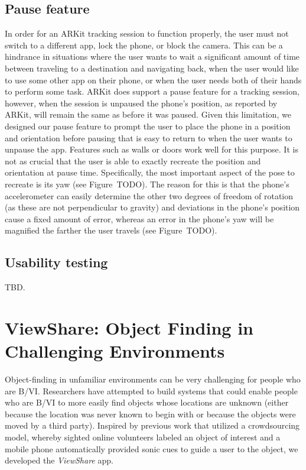 \documentclass[chi_draft]{sigchi}
\newcommand{\BVI}{B/VI\xspace}
\begin{document}
\subsection{Pause feature}
In order for an ARKit tracking session to function properly, the user must not switch to a different app, lock the phone, or block the camera.  This can be a hindrance in situations where the user wants to wait a significant amount of time between traveling to a destination and navigating back, when the user would like to use some other app on their phone, or when the user needs both of their hands to perform some task.  ARKit does support a pause feature for a tracking session, however, when the session is unpaused the phone's position, as reported by ARKit, will remain the same as before it was paused.  Given this limitation, we designed our pause feature to prompt the user to place the phone in a position and orientation before pausing that is easy to return to when the user wants to unpause the app.  Features such as walls or doors work well for this purpose.  It is not as crucial that the user is able to exactly recreate the position and orientation at pause time.  Specifically, the most important aspect of the pose to recreate is its yaw (see Figure~TODO).  The reason for this is that the phone's accelerometer can easily determine the other two degrees of freedom of rotation (as these are not perpendicular to gravity) and deviations in the phone's position cause a fixed amount of error, whereas an error in the phone's yaw will be magnified the farther the user travels (see Figure~TODO).

\subsection{Usability testing}
TBD.

\section{ViewShare: Object Finding in Challenging Environments}

Object-finding in unfamiliar environments can be very challenging for people who are \BVI {}.  Researchers have attempted to build systems that could enable people who are \BVI to more easily find objects whose locations are unknown (either because the location was never known to begin with or because the objects were moved by a third party).  Inspired by previous work \cite{bigham2010vizwizlocateit} that utilized a crowdsourcing model, whereby sighted online volunteers labeled an object of interest and a mobile phone automatically provided sonic cues to guide a user to the object, we developed the \emph{ViewShare} app.
\end{document}
